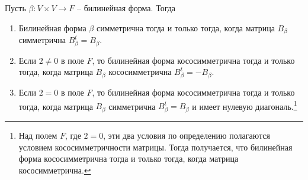 \begin{claim}\label{claim::BilSymAntiSym}
Пусть $\beta\colon V\times V\to F$ -- билинейная форма. Тогда
\begin{enumerate}
\item Билинейная форма $\beta$ симметрична тогда и только тогда, когда матрица $B_\beta$ симметрична $B_\beta^t = B_\beta$.

\item Если $2\neq 0$ в поле $F$, то билинейная форма кососимметрична тогда и только тогда, когда матрица $B_\beta$ кососимметрична $B_\beta^t = - B_\beta$.

\item Если $2 = 0$ в поле $F$, то билинейная форма кососимметрична тогда и только тогда, когда матрица $B_\beta$ симметрична $B_\beta^t = B_\beta$ и имеет нулевую диагональ.\footnote{\label{foot::AntiSymMatrix}Над полем $F$, где $2 = 0$, эти два условия по определению полагаются условием кососимметричности матрицы. Тогда получается, что билинейная форма кососимметрична тогда и только тогда, когда матрица кососимметрична.}
\end{enumerate}
\end{claim}
